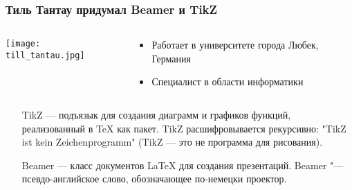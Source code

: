 \documentclass[10pt,pdf,hyperref={unicode}]{beamer}
\begin{document}
\begin{frame}
    \frametitle{Тиль Тантау придумал Beamer и TikZ}
    \begin{columns}[c]
        \begin{column}{0.5\textwidth}
            \texttt{[image: till\_tantau.jpg]}
        \end{column}
        \begin{column}{0.5\textwidth}
            \begin{itemize}
                \item Работает в университете города Любек, Германия
                \item Специалист в области информатики  
            \end{itemize}
        \end{column}
    \end{columns}
    \vfill
    \begin{itemize}
        \item[TikZ] --- подъязык для создания диаграмм и графиков функций, реализованный в \TeX{} как пакет. TikZ расшифровывается рекурсивно: "TikZ ist kein Zeichenprogramm"  (TikZ --- это не программа для рисования).
        \item[Beamer] --- класс документов \LaTeX{} для создания презентаций. Beamer "--- псевдо-английское слово, обозначающее по-немецки проектор. 
    \end{itemize}    
\end{frame}
\end{document}

